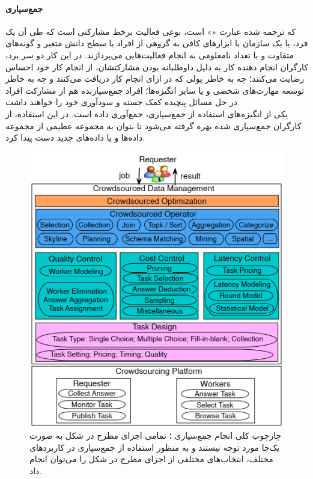 \paragraph{جمع‌سپاری}
که ترجمه شده عبارت
«»
است، نوعی فعالیت برخط
مشارکتی است که طی آن یک فرد، یا یک سازمان با ابزارهای کافی به گروهی از افراد با سطح دانش متغیر و گونه‌های متفاوت و با تعداد نامعلومی به انجام فعالیت‌هایی می‌پردازند. در این کار دو سر برد، کارگران انجام دهنده کار
به دلیل داوطلبانه بودن مشارکتشان، از انجام کار خود احساس رضایت می‌کنند؛ چه به خاطر پولی که در ازای انجام کار دریافت می‌کنند و چه به خاطر توسعه مهارت‌های شخصی و یا سایر انگیزه‌ها؛ افراد جمع‌سپارنده هم از مشارکت افراد در حل مسائل پیچیده کمک جسته و سودآوری خود را خواهند داشت. \\
یکی از انگیزه‌های استفاده از جمع‌سپاری، جمع‌آوری داده
است. در این استفاده، از کارگران جمع‌سپاری شده بهره گرفته می‌شود تا بتوان به مجموعه عظیمی از مجموعه داده‌ها و یا داده‌های جدید دست پیدا کرد.
\begin{figure}
	\centering\includegraphics[width=12cm]{Resources/crowdsourcing.PNG}
	\caption[چارچوب کلی انجام جمع‌سپاری]
	{چارچوب کلی انجام جمع‌سپاری
		\cite{li_crowdsourced_2016}؛
		تمامی اجزای مطرح در شکل به صورت یک‌جا مورد توجه نیستند و به منظور استفاده از جمع‌سپاری در کاربردهای مختلف، انتخاب‌های مختلفی از اجزای مطرح در شکل را می‌توان انجام داد.
	}
	\label{fig:crowdsourcing}
\end{figure}
